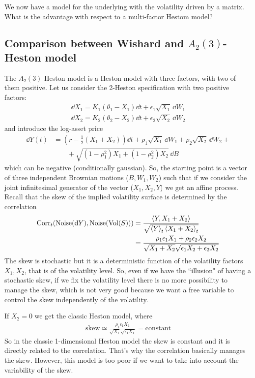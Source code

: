 We now have a model for the underlying with the volatility driven by a matrix. What is the advantage with respect to a multi-factor Hestom model?

\subsection{Comparison between Wishard and \texorpdfstring{$A_2(3)$}{A_2(3)}-Heston model}
The $A_2(3)$-Heston model is a Heston model with three factors, with two of them positive. Let us consider the 2-Heston specification with two positive factors:
\begin{align*}
    \dd X_1 = K_1(\theta_1-X_1)\dd t + \epsilon_1\sqrt{X_1}\,\dd W_1 \\
    \dd X_2 = K_2(\theta_2 - X_2)\dd t + \epsilon_2\sqrt{X_2}\,\dd W_2
\end{align*}
and introduce the log-asset price
\begin{align*}
    \dd Y(t) &= \left(r-\frac{1}{2}(X_1+X_2)\right)\dd t + \rho_1\sqrt{X_1}\,\dd W_1 + \rho_2\sqrt{X_2}\,\dd W_2 + \\
    &\qquad
    +\sqrt{(1-\rho_1^2)X_1 + (1-\rho_2^2)X_2}\,\dd B
\end{align*}
which can be negative (conditionally gaussian). So, the starting point is a vector of three independent Brownian motions ($B, W_1, W_2$) such that if we consider the joint infinitesimal generator of the vector ($X_1, X_2, Y$) we get an affine process. Recall that the skew of the implied volatility surface is determined by the correlation
\begin{align*}
    \operatorname{Corr}_t(\text{Noise}(\dd Y), \text{Noise}(\text{Vol}(S))) &= \frac{\expval{Y, X_1+X_2}}{\sqrt{\expval{Y}_t\expval{X_1+X_2}_t}} \\
    &=
    \frac{\rho_1\epsilon_1X_1 + \rho_2\epsilon_2X_2}{\sqrt{X_1+X_2}\sqrt{\epsilon_1X_2+\epsilon_2X_2}}
\end{align*}
The skew is stochastic but it is a deterministic function of the volatility factors $X_1, X_2$, that is of the volatility level. So, even if we have the ``illusion" of having a stochastic skew, if we fix the volatility level there is no more possibility to manage the skew, which is not very good because we want a free variable to control the skew independently of the volatility.
\begin{remark}
    If $X_2=0$ we get the classic Heston model, where
    \begin{align*}
        \text{skew} \simeq \frac{\rho_1\epsilon_1X_1}{\sqrt{X_1}\sqrt{\epsilon_1X_1}} = \text{constant}
    \end{align*}
    So in the classic 1-dimensional Heston model the skew is constant and it is directly related to the correlation. That's why the correlation basically manages the skew. However, this model is too poor if we want to take into account the variability of the skew.
\end{remark}
